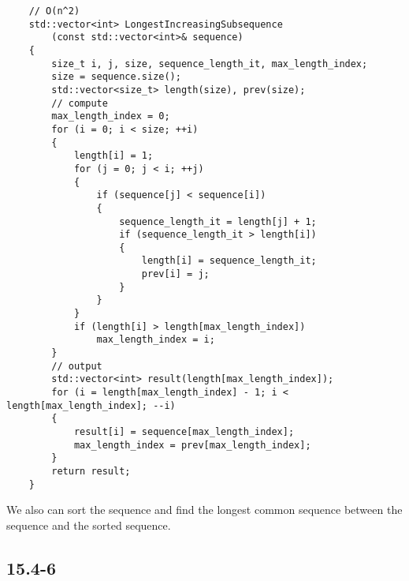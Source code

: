 \begin{verbatim}
    // O(n^2)
    std::vector<int> LongestIncreasingSubsequence
        (const std::vector<int>& sequence)
    {
        size_t i, j, size, sequence_length_it, max_length_index;
        size = sequence.size();
        std::vector<size_t> length(size), prev(size);
        // compute
        max_length_index = 0;
        for (i = 0; i < size; ++i)
        {
            length[i] = 1;
            for (j = 0; j < i; ++j)
            {
                if (sequence[j] < sequence[i])
                {
                    sequence_length_it = length[j] + 1;
                    if (sequence_length_it > length[i])
                    {
                        length[i] = sequence_length_it;
                        prev[i] = j;
                    }
                }
            }
            if (length[i] > length[max_length_index])
                max_length_index = i;
        }
        // output
        std::vector<int> result(length[max_length_index]);
        for (i = length[max_length_index] - 1; i < length[max_length_index]; --i)
        {
            result[i] = sequence[max_length_index];
            max_length_index = prev[max_length_index];
        }
        return result;
    }
\end{verbatim}

\noindent
We also can sort the sequence and find the longest common sequence 
between the sequence and the sorted sequence.

\subsection*{15.4-6}


